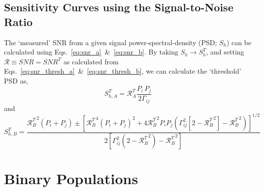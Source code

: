 \documentclass[10pt, oneside, onecolumn]{article}   	%
\newcommand\snr{\mathcal{R}}
\newcommand\snrta{\mbox{$\mathcal{R}_A^T$}}
\newcommand\snrtb{\mbox{$\mathcal{R}_B^T$}}
\newcommand\Gij{\Gamma_{ij}}
\begin{document}
    \subsection{Sensitivity Curves using the Signal-to-Noise Ratio}
    The `measured' SNR from a given signal power-spectral-density (PSD; $S_h$) can be calculated using Eqs.~\ref{eq:snr_a}~\&~\ref{eq:snr_b}.  By taking $S_h \rightarrow S_h^T$, and setting $\snr \equiv SNR = SNR^T$ as calculated from Eqs.~\ref{eq:snr_thresh_a}~\&~\ref{eq:snr_thresh_b}, we can calculate the `threshold' PSD as,
    \begin{equation}
    S_{h,A}^T = \snrta \frac{P_i \, P_j}{2 \Gamma_{ij}}
    \end{equation}
    and
    \begin{equation}
    S_{h,B}^T = \frac{
    \snrtb^2 \left(P_i + P_j\right) \pm \left[ \snrtb^4 \left(P_i + P_j\right)^2 + 4\snrtb^2 P_i P_j \left( \Gij^2 \left[2 - \snrtb^2\right] - \snrtb^2\right)\right]^{1/2}
    }{
    2\left[\Gij^2\left(2 - \snrtb^2\right) - \snrtb^2\right]
    }
    \end{equation}


    \section{Binary Populations}
\end{document}
